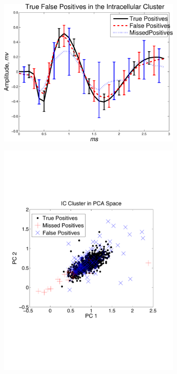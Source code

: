 \begin{center}
\begin{figure}
		\begin{subfigure}[b]{.5\textwidth}
	\includegraphics[width=\textwidth]{../figs/IntracellularTrueFalsePositivesv2}
	\caption{}
	\label{truewaveforms}
	\end{subfigure}
\begin{subfigure}[b]{.5\textwidth}
\includegraphics[width=\textwidth]{../figs/new/ICclusteroldpca.pdf}

\end{subfigure}
\end{figure}
\end{center}
